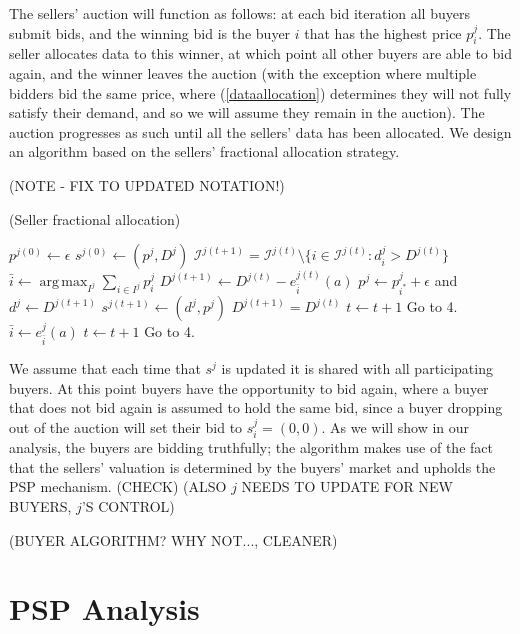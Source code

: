 \documentclass[12pt]{article}
\theoremstyle{definition}
\newcommand{\mcI}{\mathcal{I}}
\DeclareMathOperator*{\argmax}{arg\,max}
\begin{document}
\begin{multicols}{2}
The sellers' auction will function as follows: at each bid iteration all buyers
submit bids, and the winning bid is the buyer $i$ that has the highest price
$p_i^j$. The seller allocates
data to this winner, at which point all other buyers are able to bid again, and
the winner leaves the auction (with the exception where multiple bidders bid
the same price, where (\ref{dataallocation}) determines they will not fully
satisfy their demand, and so we will assume they remain in the auction). The auction progresses as such until all the
sellers' data has been allocated. We design an algorithm based on the sellers'
fractional allocation strategy.

(NOTE - FIX TO UPDATED NOTATION!)
\begin{algorithm}[H]
\caption{(Seller fractional allocation)}
\begin{algorithmic}[1]
\State $p^{j(0)} \gets \epsilon$
\State $s^{j(0)} \gets (p^j, D^j)$
\State $\mcI^{j(t+1)} = \mcI^{j(t)}\setminus \lbrace i \in \mcI^{j(t)}: d_i^j >
D^{j(t)}\rbrace$
\State $ \bar{i} \gets \displaystyle\argmax_{I^j}\sum_{i\in I^j} p_i^j$ 
\State $D^{j(t+1)} \gets D^{j(t)} - e_{\bar{i}}^{j(t)}(a)$
\State $p^j \gets p_{i^*}^j+\epsilon$ and $d^j \gets D^{j(t+1)}$
\State $s^{j(t+1)} \gets (d^j, p^j)$
\State $D^{j(t+1)} = D^{j(t)}$
\State $t \gets t+1$
\State Go to 4.
\Else
\State $\bar{i} \gets e_{\bar{i}}^j(a)$
\State $t \gets t+1$
\State Go to 4.
\EndIf
\EndWhile
\end{algorithmic}
\end{algorithm}
We assume that each time that $s^j$ is updated it is shared with all
participating buyers. At this point buyers have the opportunity to bid again,
where a buyer that does not bid again is assumed to hold the same bid, since a
buyer dropping out of the auction will set their bid to $s_i^j=(0,0)$. As we will show in our analysis, the buyers are bidding truthfully; the
algorithm makes use of the fact that the sellers' valuation is determined by
the buyers' market and upholds the PSP mechanism. (CHECK) (ALSO $j$ NEEDS TO
UPDATE FOR NEW BUYERS, $j$'S CONTROL)

(BUYER ALGORITHM? WHY NOT..., CLEANER)

\section{PSP Analysis}\label{analysis}

\end{multicols}
\end{document}
